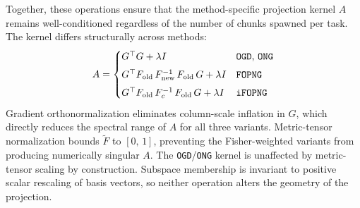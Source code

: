 Together, these operations ensure that the method-specific projection
kernel $A$ remains well-conditioned regardless of the number of chunks
spawned per task.
The kernel differs structurally across methods:
\begin{equation}
    A =
    \begin{cases}
        G^\top G + \lambda I
            & \text{\texttt{OGD}, \texttt{ONG}} \\[4pt]
        G^\top F_{\mathrm{old}}\,
            F_{\mathrm{new}}^{-1}\,
            F_{\mathrm{old}}\, G + \lambda I
            & \text{\texttt{FOPNG}} \\[4pt]
        G^\top F_{\mathrm{old}}\,
            F_c^{-1}\,
            F_{\mathrm{old}}\, G + \lambda I
            & \text{\texttt{iFOPNG}}
    \end{cases}
    \label{eq:projection_kernel}
\end{equation}
Gradient orthonormalization eliminates column-scale inflation in $G$,
which directly reduces the spectral range of $A$ for all three variants.
Metric-tensor normalization bounds $\tilde{F}$ to $[0,\,1]$, preventing
the Fisher-weighted variants from producing numerically singular $A$.
The \texttt{OGD}/\texttt{ONG} kernel is unaffected by metric-tensor
scaling by construction.
Subspace membership is invariant to positive scalar rescaling of basis
vectors, so neither operation alters the geometry of the projection.